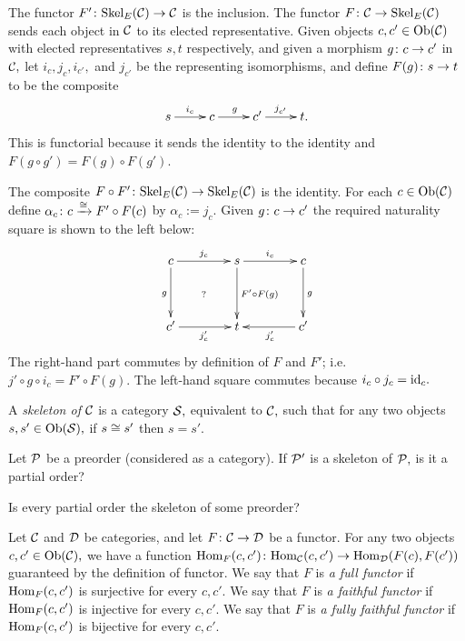 \documentclass[CT4S-EN-RU]{subfiles}
\begin{document}
\begin{proofENG}
The functor $F'\colon\textnormal{Skel}_E(\mathcal{C})\rightarrow\mathcal{C}$ is the inclusion. The functor $F\colon\mathcal{C}\rightarrow\textnormal{Skel}_E(\mathcal{C})$ sends each object in $\mathcal{C}$ to its elected representative. Given objects $c,c'\in\textnormal{Ob}(\mathcal{C})$ with elected representatives $s,t$ respectively, and given a morphism $g\colon c\rightarrow c'$ in $\mathcal{C},$ let $i_c,j_c,i_{c'},$ and $j_{c'}$ be the representing isomorphisms, and define $F(g)\colon s\rightarrow t$ to be the composite 
$$\xymatrix{s\ar[r]^{i_c}&c\ar[r]^g&c'\ar[r]^{j_{c'}}&t.}$$
This is functorial because it sends the identity to the identity and $F(g\circ g')=F(g)\circ F(g').$

The composite $F\circ F'\colon\textnormal{Skel}_E(\mathcal{C})\rightarrow\textnormal{Skel}_E(\mathcal{C})$ is the identity. For each $c\in\textnormal{Ob}(\mathcal{C})$ define $\alpha_c\colon c\xrightarrow{\cong} F'\circ F(c)$ by  $\alpha_c:=j_c.$ Given $g\colon c\rightarrow c'$ the required naturality square is shown to the left below:
$$
\xymatrix@=40pt{
c\ar[r]^{j_c}\ar[d]_{g}\ar@{}[dr]|{?}&s\ar[r]^{i_c}\ar[d]^{F'\circ F(g)}&c\ar[d]^g\\
c'\ar[r]_{j_c'}&t&c'\ar[l]^{j_c'}}
$$
The right-hand part commutes by definition of $F$ and $F'$; i.e. $j'\circ g\circ i_c=F'\circ F(g).$ The left-hand square commutes because $i_c\circ j_c=\textnormal{id}_c.$
\end{proofENG}

\begin{proofRUS}
\end{proofRUS}

\begin{definitionENG}
A {\em skeleton of $\mathcal{C}$} is a category $\mathcal{S},$ equivalent to $\mathcal{C},$ such that for any two objects $s,s'\in\textnormal{Ob}(\mathcal{S}),$ if $s\cong s'$ then $s=s'.$ 
\end{definitionENG}

\begin{definitionRUS}
\end{definitionRUS}

\begin{exerciseENG}
Let $\mathcal{P}$ be a preorder (considered as a category).
\sexc If $\mathcal{P}'$ is a skeleton of $\mathcal{P},$ is it a partial order?
\item Is every partial order the skeleton of some preorder?
\endsexc
\end{exerciseENG}

\begin{exerciseRUS}
\end{exerciseRUS}

\begin{definitionENG}\label{def:full faithful}
Let $\mathcal{C}$ and $\mathcal{D}$ be categories, and let $F\colon\mathcal{C}\rightarrow\mathcal{D}$ be a functor. For any two objects $c,c'\in\textnormal{Ob}(\mathcal{C}),$ we have a function $\textnormal{Hom}_F(c,c')\colon\textnormal{Hom}_\mathcal{C}(c,c')\rightarrow\textnormal{Hom}_\mathcal{D}(F(c),F(c'))$ guaranteed by the definition of functor.
We say that $F$ is {\em a full functor} if $\textnormal{Hom}_F(c,c')$ is surjective for every $c,c'.$
We say that $F$ is {\em a faithful functor} if $\textnormal{Hom}_F(c,c')$ is injective for every $c,c'.$ We say that $F$ is {\em a fully faithful functor} if $\textnormal{Hom}_F(c,c')$ is bijective for every $c,c'.$
\end{definitionENG}
\end{document}

